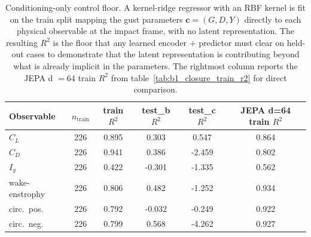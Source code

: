 
\begin{table}
  \centering
  \caption{Conditioning-only control floor. A kernel-ridge regressor with an
  RBF kernel is fit on the train split mapping the gust parameters
  $\mathbf{c} = (G, D, Y)$ directly to each physical observable at the impact frame,
  with no latent representation. The resulting $R^2$ is the floor that any learned
  encoder $+$ predictor must clear on held-out cases to demonstrate that the latent
  representation is contributing beyond what is already implicit in the parameters.
  The rightmost column reports the JEPA d $= 64$ train $R^2$ from table~\ref{tab:b1_closure_train_r2}
  for direct comparison.}
  \label{tab:conditioning_floor}
  \small
  \begin{tabular}{l c c c c c}
    \toprule
    Observable & $n_{\text{train}}$ & train $R^2$ & test\_b $R^2$ & test\_c $R^2$ & JEPA d=64 train $R^2$ \\
    \midrule
    $C_L$            & 226 & 0.895 & 0.303  & 0.547  & 0.864 \\
    $C_D$            & 226 & 0.941 & 0.386  & -2.459 & 0.802 \\
    $I_y$            & 226 & 0.422 & -0.301 & -1.335 & 0.562 \\
    wake-enstrophy   & 226 & 0.806 & 0.482  & -1.252 & 0.934 \\
    circ.\ pos.\     & 226 & 0.792 & -0.032 & -0.249 & 0.922 \\
    circ.\ neg.\     & 226 & 0.799 & 0.568  & -4.262 & 0.927 \\
    \bottomrule
  \end{tabular}
\end{table}
